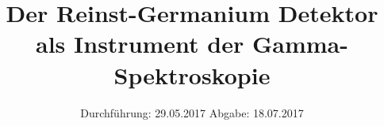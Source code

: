 

\subject{V 18}
\title{Der Reinst-Germanium Detektor als Instrument der Gamma-Spektroskopie}
\date{
  Durchführung: 29.05.2017
  \hspace{3em}
  Abgabe: 18.07.2017
}



\maketitle
\thispagestyle{empty}
\tableofcontents
\newpage






\printbibliography


